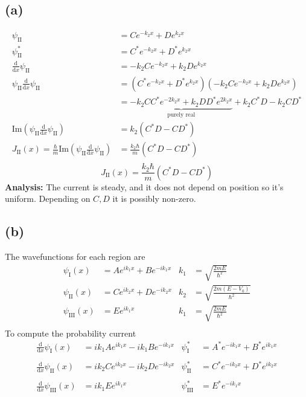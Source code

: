 \documentclass[letter, 10pts]{article}
\newcommand{\hb}{\hbar}
\begin{document}
\subsection*{(a)} 
\begin{align*}
	\psi_{\text{II}}
	&= C e^{- k_2 x } + D e^{k_2 x} \\
	\psi^{*} _\text{II}&= 
	C^{*} e^{- k_2 x} + D^{*} e^{k_2 x}\\
	\frac{\mathrm{d} }{\mathrm{d} x} \psi_\text{II} 
	&= 
	-k_2 C e^{-k_2 x} + k_2 D e^{k_2 x}\\
	\psi_\text{II} \frac{\mathrm{d} }{\mathrm{d} x} \psi_\text{II} 
	&= \left(C^{*} e^{-k_2 x}  + D^{*} e^{k_2 x}\right) 
	\left(-k_2 Ce^{-k_2 x} + k_2 De^{k_2 x}\right)\\
	&= \underbrace{-k_2 C C^{*} e^{-2 k_2 x} + k_2 D D^{*} e^{2 k_2 x}}_{\text{purely real}}
	+ k_2 C^{*} D - k_2 CD^{*}\\
	\text{Im} \left(\psi_\text{II} \frac{\mathrm{d} }{\mathrm{d} x} \psi_\text{II} \right)&= 
	k_2 \left(C^{*} D - C D^{*}\right)\\
	J_\text{II} (x) = \frac{\hb}{m} \text{Im}\left(
	\psi_\text{II} \frac{\mathrm{d} }{\mathrm{d} x} \psi_\text{II} 
	\right) &= \frac{k_2 \hb}{m} \left(C^{*} D - C D^{*}\right) \\
\end{align*}
\[
\boxed{
	J_\text{II} (x) 
	= \frac{k_2 \hb}{m} \left(C^{*} D - C D^{*}\right) 
}
\] 
\textbf{Analysis: }
The current is steady, and it does not depend on position so it's uniform. Depending on $C,D$ it is possibly non-zero. 

\subsection*{(b)}
The wavefunctions for each region are
\begin{align*}
	\psi_\text{I} (x)&= A e^{i k_1 x} + B e^{- i k_1 x} &k_1 &= \sqrt{\frac{2mE}{\hb^2}} \\
	\psi_\text{II} (x) &= Ce^{i k_2 x} + D e^{- i k_2 x} &k_2 &= \sqrt{\frac{2m(E- V_0)}{\hb^2}} \\
	\psi_\text{III} (x)&= E e^{i k_1 x}  &k_1 &= \sqrt{\frac{2mE}{\hb^2}} \\
\end{align*}
To compute the probability current 
\begin{align*}
	\frac{\mathrm{d} }{\mathrm{d} x} \psi_\text{I}(x) 
	&= i k_1 A e^{i k_1 x} - i k_1 B e^{-ik_1 x} 
	& \psi_\text{I}^{*} &=   A^{*}e^{- i k_1 x} + B^{*} e^{i k_1 x}
	\\ \ \\
	\frac{\mathrm{d} }{\mathrm{d} x} \psi_\text{II}(x) 
	&= i k_2 C e^{i k_2 x} - i k_2 D e^{-ik_2 x} 
	& \psi_\text{II}^{*} &= C^{*} e^{- i k_2 x} + D^{*} e^{i k_2 x}
	\\ \ \\ 
	\frac{\mathrm{d} }{\mathrm{d} x} \psi_\text{III}(x) 
	&= i k_1 E e^{i k_1 x} 
	& \psi_\text{III}^{*} &= E^{*}{e^{-i k_1 x}}
\end{align*}
\end{document}
